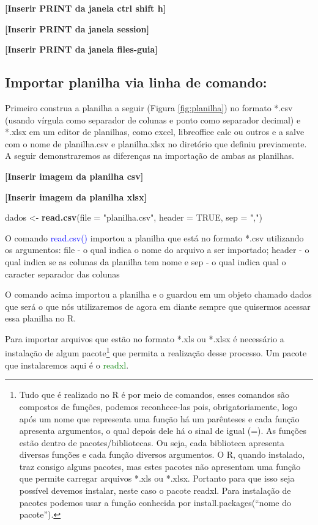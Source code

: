 \documentclass[titlepage, oneside, openany, a4paper]{book}
\newenvironment{Shaded}{\begin{snugshade}}{\end{snugshade}}
\newcommand{\DataTypeTok}[1]{\textcolor[rgb]{0.13,0.29,0.53}{#1}}
\newcommand{\KeywordTok}[1]{\textcolor[rgb]{0.13,0.29,0.53}{\textbf{#1}}}
\newcommand{\NormalTok}[1]{#1}
\newcommand{\OtherTok}[1]{\textcolor[rgb]{0.56,0.35,0.01}{#1}}
\newcommand{\StringTok}[1]{\textcolor[rgb]{0.31,0.60,0.02}{#1}}
\begin{document}
\textbf{{[}Inserir PRINT da janela ctrl shift h{]}}

\textbf{{[}Inserir PRINT da janela session{]}}

\textbf{{[}Inserir PRINT da janela files-guia{]}}

\hypertarget{importar-planilha-via-linha-de-comando}{%
\subsection{Importar planilha via linha de comando:}\label{importar-planilha-via-linha-de-comando}}

Primeiro construa a planilha a seguir (Figura \ref{fig:planilha}) no formato *.csv (usando vírgula como separador de colunas e ponto como separador decimal) e *.xlsx em um editor de planilhas, como excel, libreoffice calc ou outros e a salve com o nome de planilha.csv e planilha.xlsx no diretório que definiu previamente. A seguir demonstraremos as diferenças na importação de ambas as planilhas.

\textbf{{[}Inserir imagem da planilha csv{]}}

\textbf{{[}Inserir imagem da planilha xlsx{]}}

\begin{Shaded}
\begin{Highlighting}[]
\NormalTok{dados <-}\StringTok{ }\KeywordTok{read.csv}\NormalTok{(}\DataTypeTok{file =} \StringTok{"planilha.csv"}\NormalTok{, }\DataTypeTok{header =} \OtherTok{TRUE}\NormalTok{, }\DataTypeTok{sep =} \StringTok{","}\NormalTok{)}
\end{Highlighting}
\end{Shaded}

O comando \textcolor{blue}{read.csv()} importou a planilha que está no formato *.csv utilizando os argumentos: file - o qual indica o nome do arquivo a ser importado; header - o qual indica se as colunas da planilha tem nome e sep - o qual indica qual o caracter separador das colunas

O comando acima importou a planilha e o guardou em um objeto chamado dados que será o que nós utilizaremos de agora em diante sempre que quisermos acessar essa planilha no R.

Para importar arquivos que estão no formato *.xls ou *.xlsx é necessário a instalação de algum pacote\footnote{Tudo que é realizado no R é por meio de comandos, esses comandos são compostos de funções, podemos reconhece-las pois, obrigatoriamente, logo após um nome que representa uma função há um parênteses e cada função apresenta argumentos, o qual depois dele há o sinal de igual (=). As funções estão dentro de pacotes/bibliotecas. Ou seja, cada biblioteca apresenta diversas funções e cada função diversos argumentos. O R, quando instalado, traz consigo alguns pacotes, mas estes pacotes não apresentam uma função que permite carregar arquivos *.xls ou *.xlsx. Portanto para que isso seja possível devemos instalar, neste caso o pacote readxl. Para instalação de pacotes podemos usar a função conhecida por install.packages(``nome do pacote'').} que permita a realização desse processo. Um pacote que instalaremos aqui é o \textcolor{green}{readxl}.
\end{document}
